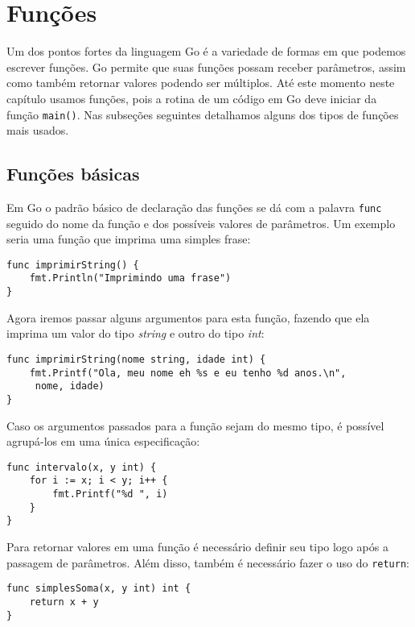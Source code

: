 \documentclass{SBCbookchapter}
\begin{document}
\section{Funções}

Um dos pontos fortes da linguagem Go é a variedade de formas em que podemos escrever funções. Go permite que suas funções possam receber parâmetros, assim como também retornar valores podendo ser múltiplos. Até este momento neste capítulo usamos funções, pois a rotina de um código em Go deve iniciar da função \texttt{main()}. Nas subseções seguintes detalhamos alguns dos tipos de funções mais usados.

\subsection{Funções básicas}

Em Go o padrão básico de declaração das funções se dá com a palavra \texttt{func} seguido do nome da função e dos possíveis valores de parâmetros. Um exemplo seria uma função que imprima uma simples frase:

\begin{lstlisting}
func imprimirString() {
	fmt.Println("Imprimindo uma frase")
}
\end{lstlisting}

Agora iremos passar alguns argumentos para esta função, fazendo que ela imprima um valor do tipo \textit{string} e outro do tipo \textit{int}:

\begin{lstlisting}
func imprimirString(nome string, idade int) {
	fmt.Printf("Ola, meu nome eh %s e eu tenho %d anos.\n",
	 nome, idade)
}
\end{lstlisting}

Caso os argumentos passados para a função sejam do mesmo tipo, é possível agrupá-los em uma única especificação:

\begin{lstlisting}
func intervalo(x, y int) {
	for i := x; i < y; i++ {
		fmt.Printf("%d ", i)
	}
}
\end{lstlisting}

Para retornar valores em uma função é necessário definir seu tipo logo após a passagem de parâmetros. Além disso, também é necessário fazer o uso do \texttt{return}:

\begin{lstlisting}
func simplesSoma(x, y int) int {
	return x + y
}
\end{lstlisting}
\end{document}
